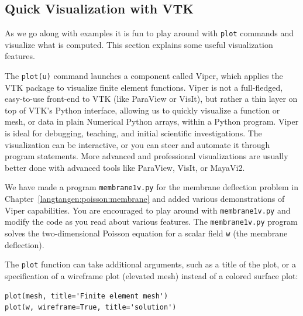 \subsection{Quick Visualization with VTK}
\label{langtangen:quickviz}
As we go along with examples it is fun to play around with
{\fontsize{12pt}{12pt}\texttt{plot}} commands and visualize what is computed. This section explains
some useful visualization features.

The {\fontsize{12pt}{12pt}\verb!plot(u)!} command launches a \fenics{} component called Viper, which
applies the VTK package to visualize finite element functions.
Viper is not a full-fledged, easy-to-use front-end to VTK (like ParaView
or VisIt), but rather a thin layer on top of VTK's Python interface,
allowing us to quickly visualize a \dolfin{} function or mesh, or data in
plain Numerical Python arrays, within a Python program.
Viper is ideal for debugging, teaching, and initial scientific investigations.
The visualization can be interactive, or you can steer and automate it
through program statements.
More advanced and professional visualizations are usually better done with
advanced tools like ParaView, VisIt, or MayaVi2.

We have made a program {\fontsize{12pt}{12pt}\texttt{membrane1v.py}} for the membrane deflection
problem in Chapter~\ref{langtangen:poisson:membrane} and added various
demonstrations of Viper capabilities. You are encouraged to play around with
{\fontsize{12pt}{12pt}\texttt{membrane1v.py}} and modify the code as you read about various features.
The {\fontsize{12pt}{12pt}\texttt{membrane1v.py}} program solves the two-dimensional Poisson
equation for a scalar field {\fontsize{12pt}{12pt}\texttt{w}} (the membrane deflection).

The {\fontsize{12pt}{12pt}\texttt{plot}} function can take additional arguments, such as
a title of the plot, or a specification of a wireframe plot (elevated mesh)
instead of a colored surface plot:
\begin{Verbatim}[fontsize=\fontsize{10pt}{10pt},tabsize=8,baselinestretch=1.05,
fontfamily=tt,xleftmargin=7mm]
plot(mesh, title='Finite element mesh')
plot(w, wireframe=True, title='solution')
\end{Verbatim}
\noindent

